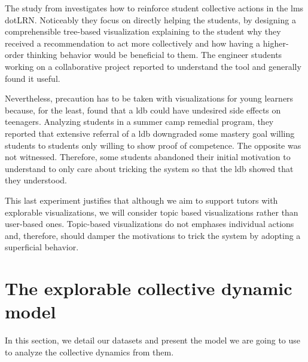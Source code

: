 \documentclass[a4paper,twoside]{article}
\begin{document}
The study from \cite{Anaya2016} investigates how to reinforce student collective actions in the \gls{lms} dotLRN.  Noticeably they focus on directly helping the students, by designing a comprehensible tree-based visualization explaining to the student why they received a recommendation to act more collectively and how having a higher-order thinking behavior would be beneficial to them.
The engineer students working on a collaborative project reported to understand the tool and generally found it useful.

Nevertheless, precaution has to be taken with visualizations for young learners because, for the least, \cite{Lonn2015} found that a \gls{ldb} could have undesired side effects on teenagers.  Analyzing students in a summer camp remedial program, they reported that extensive referral of a \gls{ldb} downgraded some mastery goal willing students to students only willing to show proof of competence.  The opposite was not witnessed.  Therefore, some students abandoned their initial motivation to understand to only care about tricking the system so that the \gls{ldb} showed that they understood.

This last experiment justifies that although we aim to support tutors with explorable visualizations, we will consider topic based visualizations rather than user-based ones.  Topic-based visualizations do not emphases individual actions and, therefore, should damper the motivations to trick the system by adopting a superficial behavior.


\section{The explorable collective dynamic model}
\label{section:4}
In this section, we detail our datasets and present the model we are going to use to analyze the collective dynamics from them.
\end{document}
